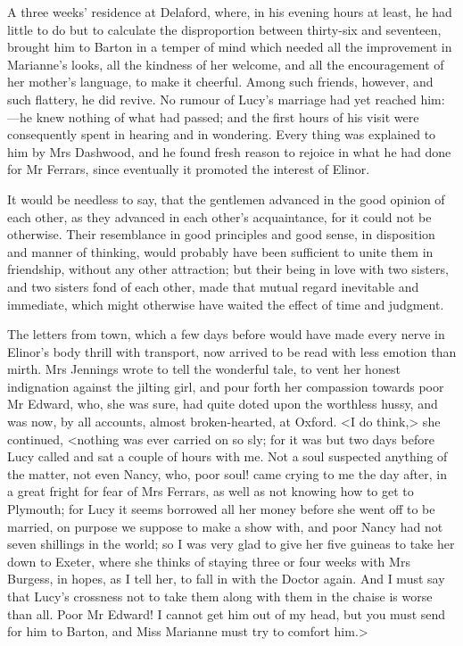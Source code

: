 A three weeks' residence at Delaford, where, in his evening hours at least, he had little to do but to calculate the disproportion between thirty-six and seventeen, brought him to Barton in a temper of mind which needed all the improvement in Marianne's looks, all the kindness of her welcome, and all the encouragement of her mother's language, to make it cheerful. Among such friends, however, and such flattery, he did revive. No rumour of Lucy's marriage had yet reached him:—he knew nothing of what had passed; and the first hours of his visit were consequently spent in hearing and in wondering. Every thing was explained to him by Mrs Dashwood, and he found fresh reason to rejoice in what he had done for Mr Ferrars, since eventually it promoted the interest of Elinor.

It would be needless to say, that the gentlemen advanced in the good opinion of each other, as they advanced in each other's acquaintance, for it could not be otherwise. Their resemblance in good principles and good sense, in disposition and manner of thinking, would probably have been sufficient to unite them in friendship, without any other attraction; but their being in love with two sisters, and two sisters fond of each other, made that mutual regard inevitable and immediate, which might otherwise have waited the effect of time and judgment.

The letters from town, which a few days before would have made every nerve in Elinor's body thrill with transport, now arrived to be read with less emotion than mirth. Mrs Jennings wrote to tell the wonderful tale, to vent her honest indignation against the jilting girl, and pour forth her compassion towards poor Mr Edward, who, she was sure, had quite doted upon the worthless hussy, and was now, by all accounts, almost broken-hearted, at Oxford. <I do think,> she continued, <nothing was ever carried on so sly; for it was but two days before Lucy called and sat a couple of hours with me. Not a soul suspected anything of the matter, not even Nancy, who, poor soul! came crying to me the day after, in a great fright for fear of Mrs Ferrars, as well as not knowing how to get to Plymouth; for Lucy it seems borrowed all her money before she went off to be married, on purpose we suppose to make a show with, and poor Nancy had not seven shillings in the world; so I was very glad to give her five guineas to take her down to Exeter, where she thinks of staying three or four weeks with Mrs Burgess, in hopes, as I tell her, to fall in with the Doctor again. And I must say that Lucy's crossness not to take them along with them in the chaise is worse than all. Poor Mr Edward! I cannot get him out of my head, but you must send for him to Barton, and Miss Marianne must try to comfort him.>

